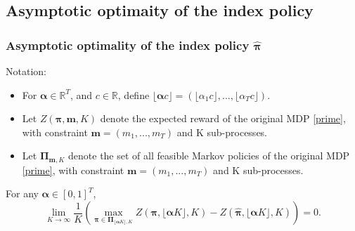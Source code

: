 \documentclass{beamer}
\newcommand{\mv}{\mathbf{m}}
\newcommand{\alphav}{\pmb{\alpha}}
\newcommand{\allp}{\pmb{\pi}}
\newcommand{\allpset}{\mathbf{\Pi}}
\begin{document}
\subsection{Asymptotic optimaity of the index policy}
\begin{frame}[plain]
\tableofcontents[currentsubsection]
\end{frame}
\begin{frame}[plain]
\frametitle{Asymptotic optimality of the index policy $\hat{\allp}$}
Notation:
\begin{itemize}
\item For $\alphav\in \mathbb{R}^T$, and $c\in \mathbb{R}$, define $\lfloor\alphav c\rfloor=(\lfloor\alpha_1 c\rfloor,...,\lfloor\alpha_Tc\rfloor)$.
\item Let $Z(\allp, \mv, K)$ denote the expected reward of the original MDP \eqref{prime}, with constraint $\mv=(m_1,...,m_T)$ and K sub-processes.
\item Let $\allpset_{\mv,K}$ denote the set of all feasible Markov policies of the original MDP \eqref{prime}, with constraint $\mv=(m_1,...,m_T)$ and K sub-processes.
\end{itemize}
\begin{theorem}[1]
For any $\alphav \in [0,1]^T$,
\begin{equation}
\lim_{K\rightarrow\infty}\frac{1}{K}\left(\max_{\allp\in\allpset_{\lfloor \alphav K\rfloor,K}}Z(\allp,\lfloor \alphav K\rfloor,K)-Z(\hat{\allp},\lfloor \alphav K\rfloor,K)\right) = 0.
\end{equation}
\end{theorem}
\end{frame}
\end{document}
